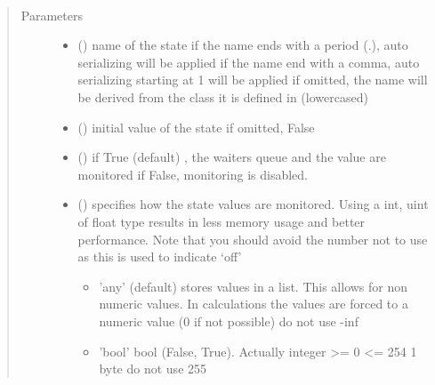 \documentclass[letterpaper,10pt,english]{sphinxmanual}
\begin{document}
\begin{fulllineitems}
\label{\detokenize{Reference:salabim.State}}~\begin{quote}\begin{description}
\item[{Parameters}] \leavevmode\begin{itemize}
\item {} 
 () \textendash{} name of the state 
if the name ends with a period (.),
auto serializing will be applied 
if the name end with a comma,
auto serializing starting at 1 will be applied 
if omitted, the name will be derived from the class
it is defined in (lowercased)

\item {} 
 (\sphinxstyleliteralemphasis{\sphinxupquote{, }}) \textendash{} initial value of the state 
if omitted, False

\item {} 
 () \textendash{} if True (default) , the waiters queue and the value are monitored 
if False, monitoring is disabled.

\item {} 
 () \textendash{} 
specifies how the state values are monitored. Using a
int, uint of float type results in less memory usage and better
performance. Note that you should avoid the number not to use
as this is used to indicate ‘off’
\begin{itemize}
\item {} 
’any’ (default) stores values in a list. This allows for
non numeric values. In calculations the values are
forced to a numeric value (0 if not possible) do not use -inf

\item {} 
’bool’ bool (False, True). Actually integer \textgreater{}= 0 \textless{}= 254 1 byte do not use 255


\end{itemize}
\end{itemize}
\end{description}
\end{quote}
\end{fulllineitems}
\end{document}
